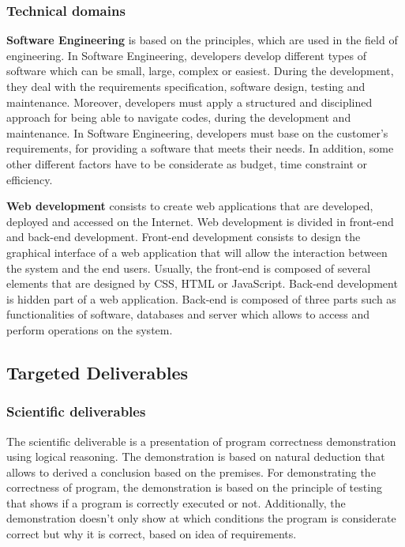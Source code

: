 \documentclass[conference,compsoc]{IEEEtran}
\begin{document}
\subsubsection{Technical domains} 

\textbf{Software Engineering} is based on the principles, which are used in the field of engineering. In Software Engineering, developers develop different types of software which can be small, large, complex or easiest. During the development, they deal with the requirements specification, software design, testing and maintenance. Moreover, developers must apply a structured and disciplined approach for being able to navigate codes, during the development and maintenance.                                   
In Software Engineering, developers must base on the customer's requirements, for providing a software that meets their needs. In addition, some other different factors have to be considerate as budget, time constraint or efficiency.

\textbf{Web development} consists to create web applications that are developed, deployed and accessed on the Internet. Web development is divided in front-end and back-end development.                                    
Front-end development consists to design the graphical interface of a web application that will allow the interaction between the system and the end users. Usually, the front-end is composed of several elements that are designed by CSS, HTML or JavaScript.                                                                                           
Back-end development is hidden part of a web application. Back-end is composed of three parts such as functionalities of software, databases and server which allows to access and perform operations on the system.

\subsection{Targeted Deliverables}
\label{sec-deliverables}
\subsubsection{Scientific deliverables}

The scientific deliverable is a presentation of program correctness demonstration using logical reasoning. The demonstration is based on natural deduction that allows to derived a conclusion based on the premises. For demonstrating the correctness of program, the demonstration is based on the principle of testing that shows if a program is correctly executed or not.  Additionally, the demonstration doesn’t only show at which conditions the program is considerate correct but why it is correct, based on idea of requirements.  
\end{document}
